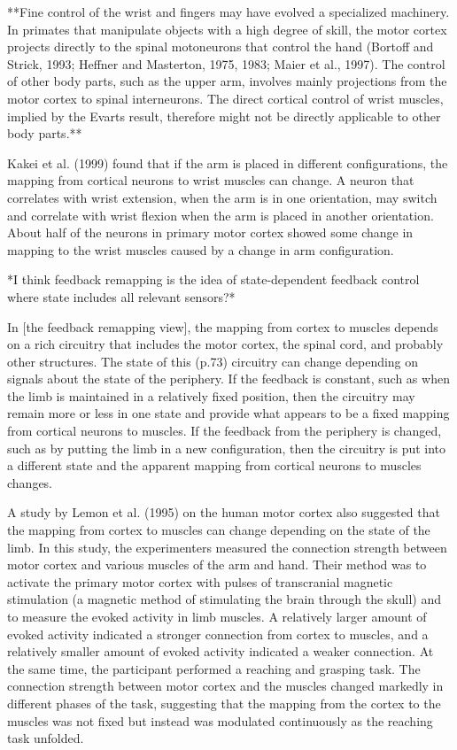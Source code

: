 \documentclass[../main.tex]{subfiles}
\begin{document}
{{**Fine control of the wrist and fingers may have evolved a specialized machinery. In primates that manipulate objects with a high degree of skill, the motor cortex projects directly to the spinal motoneurons that control the hand (Bortoff and Strick, 1993; Heffner and Masterton, 1975, 1983; Maier et al., 1997). The control of other body parts, such as the upper arm, involves mainly projections from the motor cortex to spinal interneurons. The direct cortical control of wrist muscles, implied by the Evarts result, therefore might not be directly applicable to other body parts.**

Kakei et al. (1999) found that if the arm is placed in different configurations, the mapping from cortical neurons to wrist muscles can change. A neuron that correlates with wrist extension, when the arm is in one orientation, may switch and correlate with wrist flexion when the arm is placed in another orientation. About half of the neurons in primary motor cortex showed some change in mapping to the wrist muscles caused by a change in arm configuration.

*I think feedback remapping is the idea of state-dependent feedback control where state includes all relevant sensors?*

In [the feedback remapping view], the mapping from cortex to muscles depends on a rich circuitry that includes the motor cortex, the spinal cord, and probably other structures. The state of this (p.73) circuitry can change depending on signals about the state of the periphery. If the feedback is constant, such as when the limb is maintained in a relatively fixed position, then the circuitry may remain more or less in one state and provide what appears to be a fixed mapping from cortical neurons to muscles. If the feedback from the periphery is changed, such as by putting the limb in a new configuration, then the circuitry is put into a different state and the apparent mapping from cortical neurons to muscles changes.

A study by Lemon et al. (1995) on the human motor cortex also suggested that the mapping from cortex to muscles can change depending on the state of the limb. In this study, the experimenters measured the connection strength between motor cortex and various muscles of the arm and hand. Their method was to activate the primary motor cortex with pulses of transcranial magnetic stimulation (a magnetic method of stimulating the brain through the skull) and to measure the evoked activity in limb muscles. A relatively larger amount of evoked activity indicated a stronger connection from cortex to muscles, and a relatively smaller amount of evoked activity indicated a weaker connection. At the same time, the participant performed a reaching and grasping task. The connection strength between motor cortex and the muscles changed markedly in different phases of the task, suggesting that the mapping from the cortex to the muscles was not fixed but instead was modulated continuously as the reaching task unfolded.

}}
\end{document}

